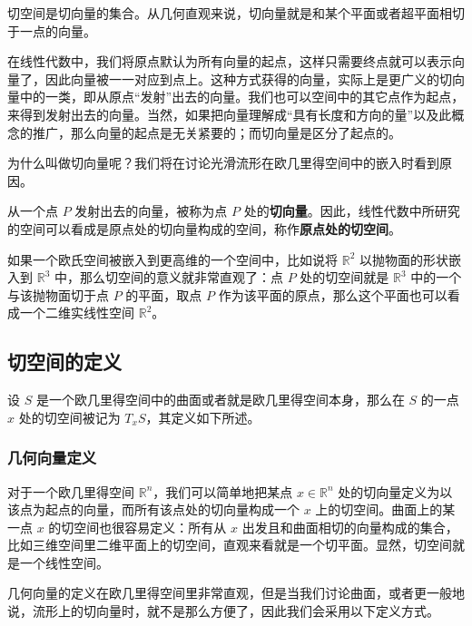 

切空间是切向量的集合。从几何直观来说，切向量就是和某个平面或者超平面相切于一点的向量。

在线性代数中，我们将原点默认为所有向量的起点，这样只需要终点就可以表示向量了，因此向量被一一对应到点上。这种方式获得的向量，实际上是更广义的切向量中的一类，即从原点“发射”出去的向量。我们也可以空间中的其它点作为起点，来得到发射出去的向量。当然，如果把向量理解成“具有长度和方向的量”以及此概念的推广，那么向量的起点是无关紧要的；而切向量是区分了起点的。

为什么叫做切向量呢？我们将在讨论光滑流形在欧几里得空间中的嵌入时看到原因。%

从一个点 $P$ 发射出去的向量，被称为点 $P$ 处的\textbf{切向量}。因此，线性代数中所研究的空间可以看成是原点处的切向量构成的空间，称作\textbf{原点处的切空间}。

如果一个欧氏空间被嵌入到更高维的一个空间中，比如说将 $\mathbb{R}^2$ 以抛物面的形状嵌入到 $\mathbb{R}^3$ 中，那么切空间的意义就非常直观了：点 $P$ 处的切空间就是 $\mathbb{R}^3$ 中的一个与该抛物面切于点 $P$ 的平面，取点 $P$ 作为该平面的原点，那么这个平面也可以看成一个二维实线性空间 $\mathbb{R}^2$。

\subsection{切空间的定义}

设 $S$ 是一个欧几里得空间中的曲面或者就是欧几里得空间本身，那么在 $S$ 的一点 $x$ 处的切空间被记为 $T_xS$，其定义如下所述。

\subsubsection{几何向量定义}

对于一个欧几里得空间 $\mathbb{R}^n$，我们可以简单地把某点 $x\in\mathbb{R}^n$ 处的切向量定义为以该点为起点的向量，而所有该点处的切向量构成一个 $x$ 上的切空间。曲面上的某一点 $x$ 的切空间也很容易定义：所有从 $x$ 出发且和曲面相切的向量构成的集合，比如三维空间里二维平面上的切空间，直观来看就是一个切平面。显然，切空间就是一个线性空间。

几何向量的定义在欧几里得空间里非常直观，但是当我们讨论曲面，或者更一般地说，流形上的切向量时，就不是那么方便了，因此我们会采用以下定义方式。

